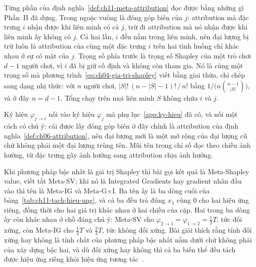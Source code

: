 Từng phần của định nghĩa~\ref{def:ch11-meta-attribution} đọc được bằng những gì
Phần~II đã dựng. Trong ngoặc vuông là đóng góp biên của $j$: attribution mà
đặc trưng $i$ nhận được khi liên minh có cả $j$, trừ đi attribution mà nó nhận
được khi liên minh ấy không có $j$. Cả hai lần, $i$ đều nằm trong liên minh,
nên đại lượng bị trừ luôn là attribution của cùng một đặc trưng $i$ trên hai
tình huống chỉ khác nhau ở sự có mặt của $j$. Trọng số phía trước là trọng số
Shapley của một trò chơi $d-1$ người chơi, vì $i$ đã bị giữ cố định và không
còn tham gia. Nó là cùng một trọng số mà
phương trình~\ref{eq:ch04-gia-tri-shapley} viết bằng giai thừa, chỉ chép sang
dạng nhị thức: với $n$ người chơi, $|S|!\,(n-|S|-1)!\,/\,n!$ bằng
$1/\bigl(n\binom{n-1}{|S|}\bigr)$, và ở đây $n = d-1$. Tổng chạy trên mọi liên
minh $S$ không chứa $i$ và $j$.

Ký hiệu $\varphi_{j \to i}$ nối vào ký hiệu $\varphi_j$ mà
phụ lục~\ref{app:ky-hieu} đã có, và nối một cách có chủ ý: cái được lấy đóng
góp biên ở đây chính là attribution của định nghĩa~\ref{def:ch06-attribution},
nên đại lượng mới là một mở rộng của đại lượng cũ chứ không phải một đại lượng
trùng tên. Mũi tên trong chỉ số đọc theo chiều ảnh hưởng, từ đặc trưng gây ảnh
hưởng sang attribution chịu ảnh hưởng.

Khi phương pháp bậc nhất là giá trị Shapley thì bài gọi kết quả là Meta-Shapley
value, viết tắt Meta-SV; khi nó là Integrated Gradients hay gradient nhân đầu
vào thì tên là Meta-IG và Meta-G$\times$I. Ba tên ấy là ba dòng cuối của
bảng~\ref{tab:ch11-tach-hieu-ung}, và cả ba đều trả đúng $x_1$ cùng $0$ cho hai
hiệu ứng riêng, đồng thời cho hai giá trị khác nhau ở hai chiều của cặp. Hai
trong ba dòng ấy còn khác nhau ở chỗ đáng chú ý: Meta-SV cho
$\varphi_{2\to1} = \varphi_{1\to2} = \tfrac{1}{2}T$, tức đối xứng, còn Meta-IG
cho $\tfrac{1}{3}T$ và $\tfrac{2}{3}T$, tức không đối xứng. Bài giải thích rằng
tính đối xứng hay không là tính chất của phương pháp bậc nhất nằm dưới chứ
không phải của xây dựng bậc hai, và dù đối xứng hay không thì cả ba biến thể
đều tách được hiệu ứng riêng khỏi hiệu ứng tương tác~\autocite{p23metagame}.
%
